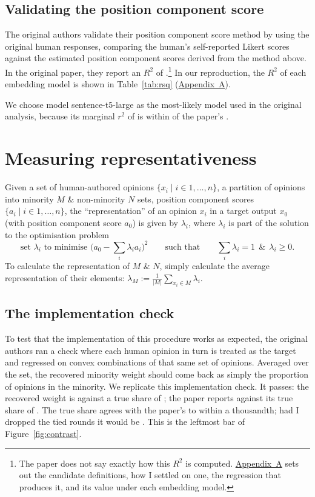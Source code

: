 \documentclass[11pt,a4paper]{article}
\begin{document}
\subsection*{Validating the position component score}

The original authors validate their position component score method by using the original human
responses, comparing the human's self-reported Likert scores against the estimated position
component scores derived from the method above. In the original paper, they report an $R^2$ of
\paperMarginalRsq{}.\footnote{The paper does not say exactly how this $R^2$ is computed.
\hyperref[app:rsq]{Appendix~A} sets out the candidate definitions, how I settled on one, the
regression that produces it, and its value under each embedding model.} In our reproduction, the
$R^2$ of each embedding model is shown in Table~\ref{tab:rsq}
(\hyperref[app:rsq]{Appendix~A}).

We choose model sentence-t5-large as the most-likely model used in
the original analysis, because its marginal $r^2$ of \oursMarginalRsqLarge{} is within
\oursMarginalRsqGapLarge{} of the paper's \paperMarginalRsq{}.

\section*{Measuring representativeness}

Given a set of human-authored opinions $\{x_i \mid i \in 1,\dots,n\}$, a partition of opinions into
minority $M$ \& non-minority $N$ sets, position component scores $\{a_i \mid i \in 1,\dots,n\}$,
the ``representation'' of an opinion $x_i$ in a target output $x_0$ (with position component score
$a_0$) is given by $\lambda_i$, where $\lambda_i$ is part of the solution to the optimisation problem
%
\begin{equation*}
\text{set } \lambda_i \text{ to minimise } \Big(a_0 - \sum_i \lambda_i a_i\Big)^2
\qquad\text{such that}\qquad \sum_i \lambda_i = 1 \ \ \&\ \ \lambda_i \geq 0 .
\end{equation*}
%
To calculate the representation of $M$ \& $N$, simply calculate the average representation of their
elements: $\lambda_M := \frac{1}{|M|}\sum_{x_i \in M} \lambda_i$.

\subsection*{The implementation check}

To test that the implementation of this procedure works as expected, the original authors ran a
check where each human opinion in turn is treated as the target and regressed on convex
combinations of that same set of opinions. Averaged over the set, the recovered minority weight
should come back as simply the proportion of opinions in the
minority. We
replicate this implementation check. It passes: the recovered weight is
\oursOpinionsLarge{} against a true share of \oursShareLarge{}; the paper reports
\paperOpinions{} against its true share of \paperShare{}. The true share agrees with the paper's to
within a thousandth; had I dropped the tied rounds it would be \shareTieDropped{}. This is the
leftmost bar of Figure~\ref{fig:contrast}.
\end{document}
